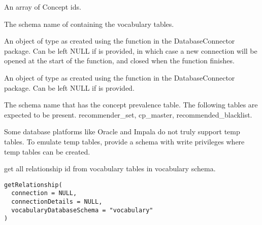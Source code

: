 \documentclass[a4paper]{book}
\begin{document}
%
\begin{Arguments}
\begin{ldescription}
\item[\code{conceptIds}] An array of Concept ids.

\item[\code{vocabularyDatabaseSchema}] The schema name of containing the vocabulary tables.

\item[\code{connection}] An object of type  as created using the
 function in the
DatabaseConnector package. Can be left NULL if 
is provided, in which case a new connection will be opened at the start
of the function, and closed when the function finishes.

\item[\code{connectionDetails}] An object of type  as created using the
 function in the
DatabaseConnector package. Can be left NULL if  is
provided.

\item[\code{conceptPrevalenceSchema}] The schema name that has the concept prevalence table. The following
tables are expected to be present. recommender\_set,
cp\_master, recommended\_blacklist.

\item[\code{tempEmulationSchema}] Some database platforms like Oracle and Impala do not truly support temp tables. To emulate temp 
tables, provide a schema with write privileges where temp tables can be created.
\end{ldescription}
\end{Arguments}
%
\begin{Description}\relax
get all relationship id from vocabulary tables in vocabulary schema.
\end{Description}
%
\begin{Usage}
\begin{verbatim}
getRelationship(
  connection = NULL,
  connectionDetails = NULL,
  vocabularyDatabaseSchema = "vocabulary"
)
\end{verbatim}
\end{Usage}
%
\end{document}
